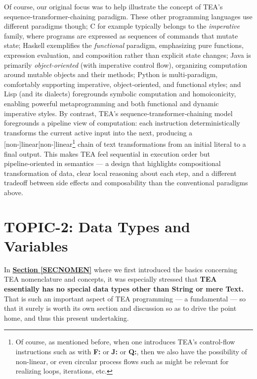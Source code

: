 \documentclass[a4paper, 18pt]{book} %
\begin{document}
{{{\begin{appendices}
\vspace{2em}

Of course, our original focus was to help illustrate the concept of TEA's sequence-transformer-chaining paradigm. These other programming languages use different paradigms though; C for example typically belongs to the \emph{imperative} family, where programs are expressed as sequences of commands that mutate state; Haskell exemplifies the \emph{functional} paradigm, emphasizing pure functions, expression evaluation, and composition rather than explicit state changes; Java is primarily \emph{object-oriented} (with imperative control flow), organizing computation around mutable objects and their methods; Python is multi‑paradigm, comfortably supporting imperative, object‑oriented, and functional styles; and Lisp (and its dialects) foregrounds symbolic computation and homoiconicity, enabling powerful metaprogramming and both functional and dynamic imperative styles. By contrast, TEA's sequence‑transformer‑chaining model foregrounds a pipeline view of computation: each instruction deterministically transforms the current active input into the next, producing a [non-]linear[non-]linear\footnote{Of course, as mentioned before, when one introduces TEA's control-flow instructions such as with \textbf{F:} or \textbf{J:} or \textbf{Q:}, then we also have the possibility of non-linear, or even circular process flows such as might be relevant for realizing loops, iterations, etc.} chain of text transformations from an initial literal to a final output. This makes TEA feel sequential in execution order but pipeline‑oriented in semantics — a design that highlights compositional transformation of data, clear local reasoning about each step, and a different tradeoff between side effects and composability than the conventional paradigms above.
 


\section{TOPIC-2: Data Types and Variables}


In \textbf{\hyperref[SECNOMEN]{Section \ref{SECNOMEN}}} where we first introduced the basics concerning TEA nomenclature and concepts, it was especially stressed that \textbf{TEA essentially has no special data types other than String or mere Text.} That is such an important aspect of TEA programming --- a fundamental --- so that it surely is worth its own section and discussion so as to drive the point home, and thus this present undertaking.



\end{appendices}}}}
\end{document}
